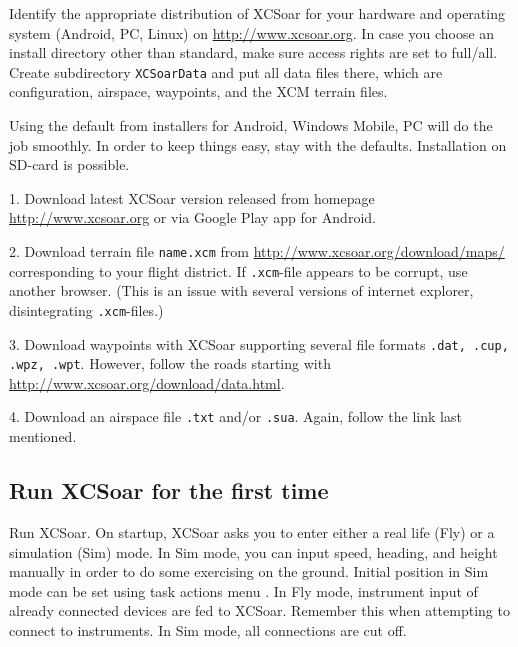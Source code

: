 \documentclass[english,a4paper,12pt]{refrep}
\begin{document}

Identify the appropriate distribution of XCSoar for your hardware and 
operating system \textsf{(Android, PC, Linux)} 
on \url{http://www.xcsoar.org}.
In case you choose an install directory other than standard, make sure access 
rights are set to full/all. Create subdirectory \texttt{XCSoarData} and put all 
data files there, which are configuration, airspace, waypoints, and the XCM 
terrain files.

Using the default from installers for Android, Windows Mobile, PC will do the 
job smoothly.  In order to keep things easy, stay with the defaults. 
Installation on SD-card is possible.

\begin{compactitem}
\item[1.] Download latest XCSoar version released from homepage 
{\url{http://www.xcsoar.org}} or via Google Play app for Android.
\item[2.] Download terrain file \texttt{name.xcm} from 
{\url{http://www.xcsoar.org/download/maps/}}
corresponding to your flight district.  If \texttt{.xcm}-file appears to be 
corrupt, use another browser. (This is an issue with several versions of 
internet explorer, disintegrating \texttt{.xcm}-files.)
\item[3.] Download waypoints with XCSoar supporting several file formats 
\texttt{.dat, .cup, .wpz, .wpt}.  However, follow the roads starting with 
{\url{http://www.xcsoar.org/download/data.html}}.
\item[4.] Download an airspace file \texttt{.txt} and/or \texttt{.sua}.  Again, follow
the link last mentioned.
\end{compactitem}

\subsection{\textcolor{flashblue}{Run XCSoar for the first time}}
Run XCSoar. On startup, XCSoar asks you to enter either a real life (Fly) or
a simulation (Sim) mode. In Sim mode, you can input speed, heading, and height 
manually in order to do some exercising on the ground. Initial position in Sim mode
can be set using task actions menu .
In Fly mode, instrument input of already connected devices are fed to XCSoar.
Remember this when  attempting to connect to instruments. In Sim mode, all 
connections are cut off.
\end{document}
